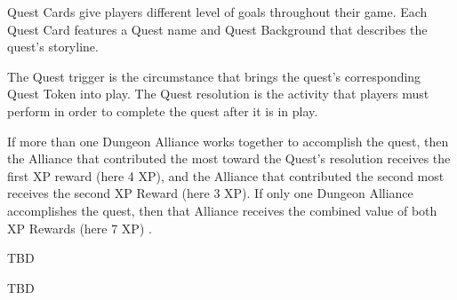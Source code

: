Quest Cards give players different level of goals throughout their game. Each Quest Card features a Quest name  and Quest Background  that describes the quest's storyline.

The Quest trigger  is the circumstance that brings the quest's corresponding Quest Token into play. The Quest resolution  is the activity that players must perform in order to complete the quest after it is in play.

If more than one Dungeon Alliance works together to
accomplish the quest, then the Alliance that contributed the
most toward the Quest's resolution receives the first XP
reward (here 4 XP), and the Alliance that contributed the second most
receives the second XP Reward (here 3 XP). If only one Dungeon Alliance
accomplishes the quest, then that Alliance receives the
combined value of both XP Rewards (here 7 XP) .

\hfill{}\hspace*{\fill}

TBD

TBD

